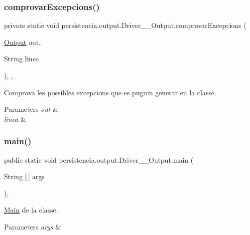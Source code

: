 \subsubsection{\texorpdfstring{comprovar\+Excepcions()}{comprovarExcepcions()}}
{\footnotesize\ttfamily private static void persistencia.\+output.\+Driver\+\_\+\+\_\+\+Output.\+comprovar\+Excepcions (\begin{DoxyParamCaption}\item[{\hyperlink{classpersistencia_1_1output_1_1Output}{Output}}]{out,  }\item[{String}]{linea }\end{DoxyParamCaption})\hspace{0.3cm}{\ttfamily [inline]}, {\ttfamily [static]}, {\ttfamily [private]}}



Comprova les possibles excepcions que es puguin generar en la classe. 


\begin{DoxyParams}{Parameters}
{\em out} & \\
\hline
{\em linea} & \\
\hline
\end{DoxyParams}
\mbox{\label{classpersistencia_1_1output_1_1Driver____Output_a1fcfdd813a7c5460772e74b5709fc030}} 
\subsubsection{\texorpdfstring{main()}{main()}}
{\footnotesize\ttfamily public static void persistencia.\+output.\+Driver\+\_\+\+\_\+\+Output.\+main (\begin{DoxyParamCaption}\item[{String \mbox{[}$\,$\mbox{]}}]{args }\end{DoxyParamCaption})\hspace{0.3cm}{\ttfamily [inline]}, {\ttfamily [static]}}



\hyperlink{classMain}{Main} de la classe. 


\begin{DoxyParams}{Parameters}
{\em args} & \\
\hline
\end{DoxyParams}


